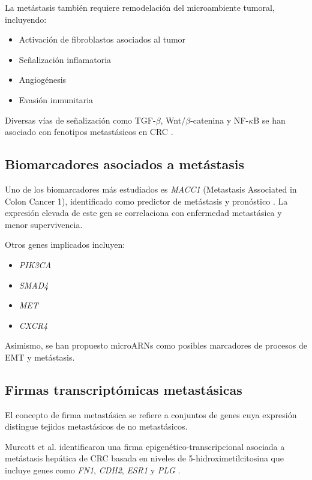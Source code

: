 \documentclass[11pt]{article}
\begin{document}
La metástasis también requiere remodelación del microambiente tumoral, incluyendo:

\begin{itemize}
\item Activación de fibroblastos asociados al tumor
\item Señalización inflamatoria
\item Angiogénesis
\item Evasión inmunitaria
\end{itemize}

Diversas vías de señalización como TGF-$\beta$, Wnt/$\beta$-catenina y NF-$\kappa$B se han asociado con fenotipos metastásicos en CRC \cite{ref8}.

\subsection{Biomarcadores asociados a metástasis}

Uno de los biomarcadores más estudiados es \textit{MACC1} (Metastasis Associated in Colon Cancer 1), identificado como predictor de metástasis y pronóstico \cite{ref3}. La expresión elevada de este gen se correlaciona con enfermedad metastásica y menor supervivencia.

Otros genes implicados incluyen:

\begin{itemize}
\item \textit{PIK3CA}
\item \textit{SMAD4}
\item \textit{MET}
\item \textit{CXCR4}
\end{itemize}

Asimismo, se han propuesto microARNs como posibles marcadores de procesos de EMT y metástasis.

\subsection{Firmas transcriptómicas metastásicas}

El concepto de firma metastásica se refiere a conjuntos de genes cuya expresión distingue tejidos metastásicos de no metastásicos.

Murcott et al. identificaron una firma epigenético-transcripcional asociada a metástasis hepática de CRC basada en niveles de 5-hidroximetilcitosina que incluye genes como \textit{FN1}, \textit{CDH2}, \textit{ESR1} y \textit{PLG} \cite{ref10}.
\end{document}
